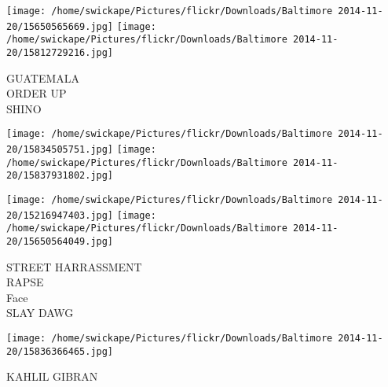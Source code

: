 \documentclass[10pt,letterpaper]{article}
\begin{document}
\vspace{0.25in}
\texttt{[image: /home/swickape/Pictures/flickr/Downloads/Baltimore 2014-11-20/15650565669.jpg]}
\texttt{[image: /home/swickape/Pictures/flickr/Downloads/Baltimore 2014-11-20/15812729216.jpg]}

GUATEMALA\\
ORDER UP\\
SHINO\\
\pagebreak

\texttt{[image: /home/swickape/Pictures/flickr/Downloads/Baltimore 2014-11-20/15834505751.jpg]}
\texttt{[image: /home/swickape/Pictures/flickr/Downloads/Baltimore 2014-11-20/15837931802.jpg]}

\texttt{[image: /home/swickape/Pictures/flickr/Downloads/Baltimore 2014-11-20/15216947403.jpg]}
\texttt{[image: /home/swickape/Pictures/flickr/Downloads/Baltimore 2014-11-20/15650564049.jpg]}

STREET HARRASSMENT\\
RAPSE\\
Face\\
SLAY DAWG\\
\pagebreak

\texttt{[image: /home/swickape/Pictures/flickr/Downloads/Baltimore 2014-11-20/15836366465.jpg]}

KAHLIL GIBRAN\\
\pagebreak
\end{document}
